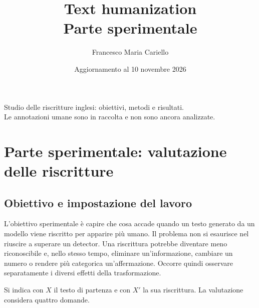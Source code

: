 \documentclass[11pt,a4paper]{article}
\title{Text humanization\\Parte sperimentale}
\author{Francesco Maria Cariello}
\date{Aggiornamento al 10 novembre 2026}
\begin{document}
\maketitle
\begin{center}
\small Studio delle riscritture inglesi: obiettivi, metodi e risultati.\\
Le annotazioni umane sono in raccolta e non sono ancora analizzate.
\end{center}
\newpage
\tableofcontents
\newpage
\section{Parte sperimentale: valutazione delle riscritture}\label{parte-sperimentale-valutazione-delle-riscritture}

\subsection{Obiettivo e impostazione del lavoro}\label{obiettivo-e-impostazione-del-lavoro}

L'obiettivo sperimentale è capire che cosa accade quando un testo generato da un modello viene riscritto per apparire più umano. Il problema non si esaurisce nel riuscire a superare un detector. Una riscrittura potrebbe diventare meno riconoscibile e, nello stesso tempo, eliminare un'informazione, cambiare un numero o rendere più categorica un'affermazione. Occorre quindi osservare separatamente i diversi effetti della trasformazione.

Si indica con \(X\) il testo di partenza e con \(X'\) la sua riscrittura. La valutazione considera quattro domande.
\end{document}
